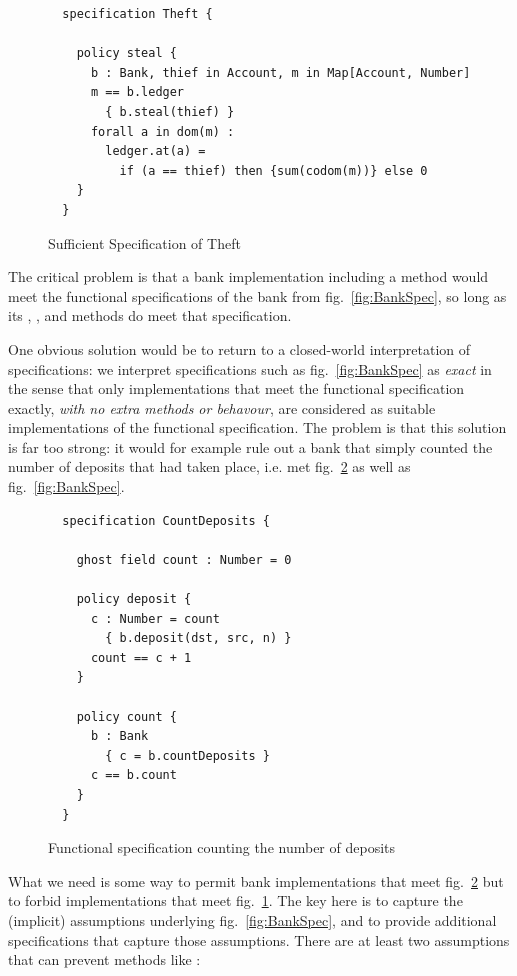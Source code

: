 \begin{figure}[tbp]
\begin{lstlisting}
  specification Theft {

    policy steal {
      b : Bank, thief in Account, m in Map[Account, Number]
      m == b.ledger
        { b.steal(thief) }
      forall a in dom(m) :
        ledger.at(a) =
          if (a == thief) then {sum(codom(m))} else 0
    }
  }
\end{lstlisting}
\caption{Sufficient Specification of Theft}
\label{fig:steal}
\end{figure}

The critical problem is that a bank implementation including a 
method would meet the functional specifications of the bank from
fig.~\ref{fig:BankSpec}, so long as its ,
, and  methods do meet
that specification.

One obvious solution would be to return to a closed-world
interpretation of specifications: we interpret specifications such as
fig.~\ref{fig:BankSpec} as \emph{exact} in the sense that only
implementations that meet the functional specification exactly,
\emph{with no extra methods or behavour}, are considered as suitable
implementations of the functional specification. The problem is that
this solution is far too strong: it would for example rule out a bank
that simply counted the number of deposits that had taken place,
i.e. met fig.~\ref{fig:count} as well as fig.~\ref{fig:BankSpec}.

\begin{figure}[tbp]
\begin{lstlisting}
  specification CountDeposits {

    ghost field count : Number = 0

    policy deposit {
      c : Number = count
        { b.deposit(dst, src, n) }
      count == c + 1
    }

    policy count {
      b : Bank
        { c = b.countDeposits }
      c == b.count
    }
  }
\end{lstlisting}
\caption{Functional specification counting the number of deposits}
\label{fig:count}
\end{figure}


What we need is some way to permit bank implementations that meet
fig.~\ref{fig:count} but to forbid implementations that meet fig.~\ref{fig:steal}.  
The key here is to capture the (implicit)
assumptions underlying fig.~\ref{fig:BankSpec}, and to provide
additional specifications that capture those assumptions.  There are
at least two assumptions that can prevent methods like :

